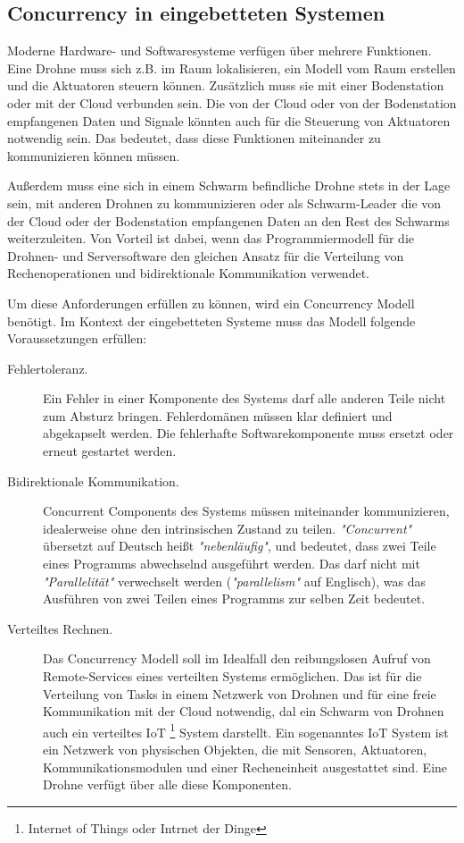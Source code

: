 \subsection{Concurrency in eingebetteten Systemen}

Moderne Hardware- und Softwaresysteme verfügen über mehrere Funktionen. Eine Drohne muss sich z.B. im Raum lokalisieren, ein Modell vom Raum erstellen und die Aktuatoren steuern können. Zusätzlich muss sie mit einer Bodenstation oder mit der Cloud verbunden sein. Die von der Cloud oder von der Bodenstation empfangenen Daten und Signale könnten auch für die Steuerung von Aktuatoren notwendig sein. Das bedeutet, dass diese Funktionen miteinander zu kommunizieren können müssen.

Außerdem muss eine sich in einem Schwarm befindliche Drohne stets in der Lage sein, mit anderen Drohnen zu kommunizieren oder als Schwarm-Leader die von der Cloud oder der Bodenstation empfangenen Daten an den Rest des Schwarms weiterzuleiten. Von Vorteil ist dabei, wenn das Programmiermodell für die Drohnen- und Serversoftware den gleichen Ansatz für die Verteilung von Rechenoperationen und bidirektionale Kommunikation verwendet.

Um diese Anforderungen erfüllen zu können, wird ein Concurrency Modell benötigt. Im Kontext der eingebetteten Systeme muss das Modell folgende Voraussetzungen erfüllen:

\begin{description} 
	\item[Fehlertoleranz.] Ein Fehler in einer Komponente des Systems darf alle anderen Teile nicht zum Absturz bringen. Fehlerdomänen müssen klar definiert und abgekapselt werden. Die fehlerhafte Softwarekomponente muss ersetzt oder erneut gestartet werden.
	
	\item[Bidirektionale Kommunikation.] Concurrent Components des Systems müssen miteinander kommunizieren, idealerweise ohne den intrinsischen Zustand zu teilen. \textit{"Concurrent"} übersetzt auf Deutsch heißt \textit{"nebenläufig"}, und bedeutet, dass zwei Teile eines Programms abwechselnd ausgeführt werden. Das darf nicht mit \textit{"Parallelität"} verwechselt werden (\textit{"parallelism"} auf Englisch), was das Ausführen von zwei Teilen eines Programms zur selben Zeit bedeutet.
	
	\item[Verteiltes Rechnen.] Das Concurrency Modell soll im Idealfall den reibungslosen Aufruf von Remote-Services eines verteilten Systems ermöglichen. Das ist für die Verteilung von Tasks in einem Netzwerk von Drohnen und für eine freie Kommunikation mit der Cloud notwendig, dal ein Schwarm von Drohnen auch ein verteiltes IoT \footnote{Internet of Things oder Intrnet der Dinge} System darstellt. Ein sogenanntes IoT System ist ein Netzwerk von physischen Objekten, die mit Sensoren, Aktuatoren, Kommunikationsmodulen und einer Recheneinheit ausgestattet sind. Eine Drohne verfügt über alle diese Komponenten.
\end{description}


